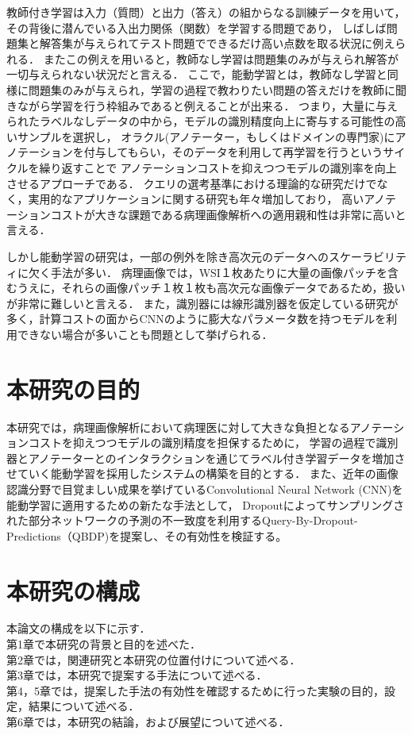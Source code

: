 教師付き学習は入力（質問）と出力（答え）の組からなる訓練データを用いて， その背後に潜んでいる入出力関係（関数）を学習する問題であり，
しばしば問題集と解答集が与えられてテスト問題でできるだけ高い点数を取る状況に例えられる．
またこの例えを用いると，教師なし学習は問題集のみが与えられ解答が一切与えられない状況だと言える．
ここで，能動学習とは，教師なし学習と同様に問題集のみが与えられ，学習の過程で教わりたい問題の答えだけを教師に聞きながら学習を行う枠組みであると例えることが出来る．
つまり，大量に与えられたラベルなしデータの中から，モデルの識別精度向上に寄与する可能性の高いサンプルを選択し，
オラクル(アノテーター，もしくはドメインの専門家)にアノテーションを付与してもらい，そのデータを利用して再学習を行うというサイクルを繰り返すことで
アノテーションコストを抑えつつモデルの識別率を向上させるアプローチである．
クエリの選考基準における理論的な研究だけでなく，実用的なアプリケーションに関する研究も年々増加しており，
高いアノテーションコストが大きな課題である病理画像解析への適用親和性は非常に高いと言える．

しかし能動学習の研究は，一部の例外を除き高次元のデータへのスケーラビリティに欠く手法が多い．
病理画像では，WSI１枚あたりに大量の画像パッチを含むうえに，それらの画像パッチ１枚１枚も高次元な画像データであるため，扱いが非常に難しいと言える．
また，識別器には線形識別器を仮定している研究が多く，計算コストの面からCNNのように膨大なパラメータ数を持つモデルを利用できない場合が多いことも問題として挙げられる．

\section{本研究の目的}
本研究では，病理画像解析において病理医に対して大きな負担となるアノテーションコストを抑えつつモデルの識別精度を担保するために，
学習の過程で識別器とアノテーターとのインタラクションを通じてラベル付き学習データを増加させていく能動学習を採用したシステムの構築を目的とする．
また、近年の画像認識分野で目覚ましい成果を挙げているConvolutional Neural Network (CNN)を能動学習に適用するための新たな手法として，
Dropoutによってサンプリングされた部分ネットワークの予測の不一致度を利用するQuery-By-Dropout-Predictions（QBDP)を提案し、その有効性を検証する。


\section{本研究の構成}
本論文の構成を以下に示す．\\
第1章で本研究の背景と目的を述べた． \\
第2章では，関連研究と本研究の位置付けについて述べる．\\
第3章では，本研究で提案する手法について述べる．\\
第4，5章では，提案した手法の有効性を確認するために行った実験の目的，設定，結果について述べる．\\
第6章では，本研究の結論，および展望について述べる．

